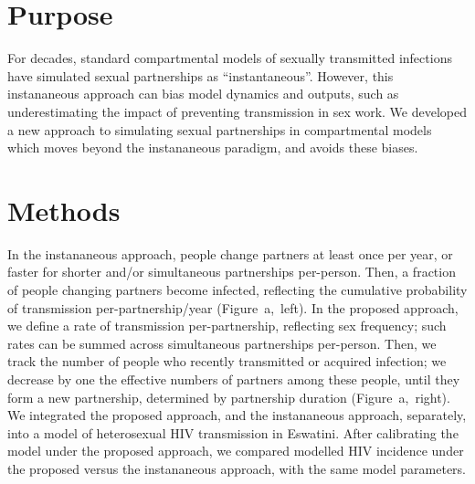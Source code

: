 \section{Purpose}
For decades, standard compartmental models of sexually transmitted infections
have simulated sexual partnerships as ``instantaneous''.
However, this instananeous approach can bias model dynamics and outputs, such as
underestimating the impact of preventing transmission in sex work.
We developed a new approach to simulating sexual partnerships in compartmental models
which moves beyond the instananeous paradigm, and avoids these biases.
\section{Methods}
In the instananeous approach, people change partners at least once per year,
or faster for shorter and/or simultaneous partnerships per-person.
Then, a fraction of people changing partners become infected,
reflecting the cumulative probability of transmission per-partnership/year (Figure~a,~left).
In the proposed approach, we define a rate of transmission per-partnership, reflecting sex frequency;
such rates can be summed across simultaneous partnerships per-person.
Then, we track the number of people who recently transmitted or acquired infection;
we decrease by one the effective numbers of partners among these people,
until they form a new partnership, determined by partnership duration (Figure~a,~right).
We integrated the proposed approach, and the instananeous approach, separately,
into a model of heterosexual HIV transmission in Eswatini.
After calibrating the model under the proposed approach,
we compared modelled HIV incidence under the proposed versus the instananeous approach,
with the same model parameters.
